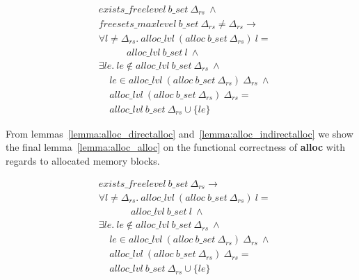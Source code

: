 \begin{lemma} 
\label{lemma:alloc_indirectalloc}
\end{lemma}
\vspace{-7pt}
\begin{align*}
&exists\_freelevel\ b\_set\ \Delta_{rs}\ \wedge\\
&freesets\_maxlevel\ b\_set\ \Delta_{rs} \neq \Delta_{rs} \longrightarrow\\
&\forall l \ne \Delta_{rs}.\ alloc\_lvl\ (alloc\ b\_set\ \Delta_{rs})\ l =\\
&\ \ \ \ \ \ \ \ \ \ \ \ \ alloc\_lvl\ b\_set\ l\ \wedge\\
&\exists le.\ le \notin alloc\_lvl\ b\_set\ \Delta_{rs}\ \wedge\\
&\ \ \ \ \ le \in alloc\_lvl\ (alloc\ b\_set\ \Delta_{rs})\ \Delta_{rs}\ \wedge\\
&\ \ \ \ \ alloc\_lvl\ (alloc\ b\_set\ \Delta_{rs})\ \Delta_{rs} =\\
&\ \ \ \ \ alloc\_lvl\ b\_set\ \Delta_{rs} \cup \lbrace le \rbrace
\end{align*}
\vspace{-12pt}

From lemmas~\ref{lemma:alloc_directalloc} and~\ref{lemma:alloc_indirectalloc} we show the final lemma~\ref{lemma:alloc_alloc} on the functional correctness of \textbf{alloc} with regards to allocated memory blocks.

\begin{lemma} 
\label{lemma:alloc_alloc}
\end{lemma}
\vspace{-7pt}
\begin{align*}
&exists\_freelevel\ b\_set\  \Delta_{rs} \longrightarrow\\
&\forall l \ne \Delta_{rs}.\ alloc\_lvl\ (alloc\ b\_set\ \Delta_{rs})\ l =\\
&\ \ \ \ \ \ \ \ \ \ \ \ \ \ \ alloc\_lvl\ b\_set\ l\ \wedge\\
&\exists le.\ le \notin alloc\_lvl\ b\_set\ \Delta_{rs}\ \wedge\\
&\ \ \ \ \ le \in alloc\_lvl\ (alloc\ b\_set\ \Delta_{rs})\ \Delta_{rs}\ \wedge\\
&\ \ \ \ \ alloc\_lvl\ (alloc\ b\_set\ \Delta_{rs})\ \Delta_{rs} =\\
&\ \ \ \ \ alloc\_lvl\ b\_set\ \Delta_{rs} \cup \lbrace le \rbrace
\end{align*}
\vspace{-12pt}

